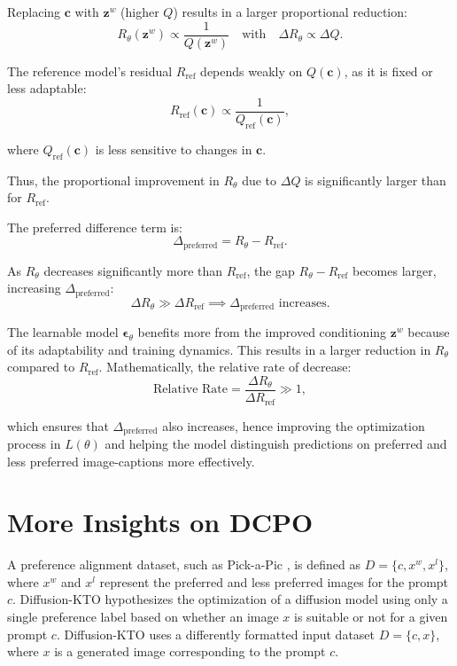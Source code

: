 Replacing $ \mathbf{c} $ with $ \mathbf{z}^w $ (higher $ Q $) results in a larger proportional reduction:
 $$
 R_\theta(\mathbf{z}^w) \propto \frac{1}{Q(\mathbf{z}^w)} \quad \text{with} \quad \Delta R_\theta \propto \Delta Q.
 $$


The reference model's residual $ R_{\text{ref}} $ depends weakly on $ Q(\mathbf{c}) $, as it is fixed or less adaptable:
$$
R_{\text{ref}}(\mathbf{c}) \propto \frac{1}{Q_{\text{ref}}(\mathbf{c})},
$$

where $ Q_{\text{ref}}(\mathbf{c}) $ is less sensitive to changes in $ \mathbf{c} $.

Thus, the proportional improvement in $ R_\theta $ due to $ \Delta Q $ is significantly larger than for $ R_{\text{ref}} $.



The preferred difference term is:
$$
\Delta_{\text{preferred}} = R_\theta - R_{\text{ref}}.
$$

As $ R_\theta $ decreases significantly more than $ R_{\text{ref}} $, the gap $ R_\theta - R_{\text{ref}} $ becomes larger, increasing $ \Delta_{\text{preferred}} $:
$$
\Delta R_\theta \gg \Delta R_{\text{ref}} \implies \Delta_{\text{preferred}} \text{ increases.}
$$


The learnable model $ \boldsymbol{\epsilon}_\theta $ benefits more from the improved conditioning $ \mathbf{z}^w $ because of its adaptability and training dynamics. This results in a larger reduction in $ R_\theta $ compared to $ R_{\text{ref}} $. Mathematically, the relative rate of decrease:
$$
\text{Relative Rate} = \frac{\Delta R_\theta}{\Delta R_{\text{ref}}} \gg 1,
$$

which ensures that $ \Delta_{\text{preferred}} $ also increases, hence improving the optimization process in $L(\theta)$ and helping the model distinguish predictions on preferred and less preferred image-captions more effectively.


\section{More Insights on DCPO}
\label{sec:appendix_more_insights}



A preference alignment dataset, such as Pick-a-Pic \citep{kirstain2023pickapic}, is defined as $ D = \{c, x^w, x^l\} $, where $ x^w $ and $ x^l $ represent the preferred and less preferred images for the prompt $ c $. Diffusion-KTO \citep{li2024aligning} hypothesizes the optimization of a diffusion model using only a single preference label based on whether an image $ x $ is suitable or not for a given prompt $ c $.  Diffusion-KTO uses a differently formatted input dataset $ D = \{c, x\} $, where $ x $ is a generated image corresponding to the prompt $ c $.

